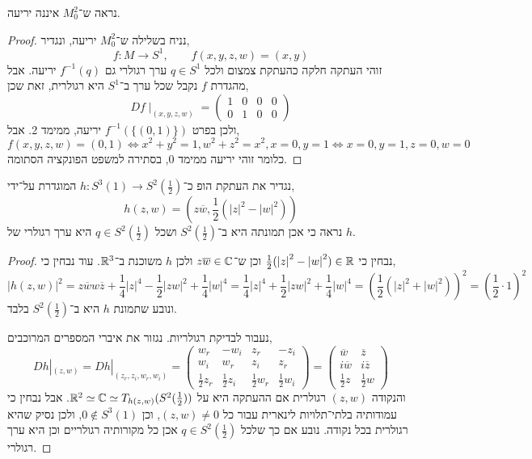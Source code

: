 \subquestion{}
נראה ש־$M_0^2$ איננה יריעה.
\begin{proof}
	נניח בשלילה ש־$M_0^2$ יריעה, ונגדיר,
	\[
		f : M \to S^1,
		\qquad
		f(x, y, z, w) = (x, y)
	\]
	זוהי העתקה חלקה כהעתקת צמצום ולכל $q \in S^1$ ערך רגולרי גם $f^{-1}(q)$ יריעה.
	אבל מהגדרת $f$ נקבל שכל ערך ב־$S^1$ היא רגולרית, זאת שכן,
	\[
		D f \mid_{(x, y, z, w)}
		= \begin{pmatrix}
			1 & 0 & 0 & 0 \\
			0 & 1 & 0 & 0
		\end{pmatrix} 
	\]
	ולכן בפרט $f^{-1}(\{(0, 1)\})$ יריעה, ממימד 2.
	אבל,
	\[
		f(x, y, z, w) = (0, 1)
		\iff x^2 + y^2 = 1, w^2 + z^2 = x^2, x = 0, y = 1
		\iff x = 0, y = 1, z = 0, w = 0
	\]
	כלומר זוהי יריעה ממימד 0, בסתירה למשפט הפונקציה הסתומה.
\end{proof}

\question{}
נגדיר את העתקת הופ כ־$h : S^3(1) \to S^2(\frac{1}{2})$ המוגדרת על־ידי,
\[
	h(z, w)
	= (z \overline{w}, \frac{1}{2} ({|z|}^2 - {|w|}^2))
\]
נראה כי אכן תמונתה היא ב־$S^2(\frac{1}{2})$ ושכל $q \in S^2(\frac{1}{2})$ היא ערך רגולרי של $h$.
\begin{proof}
	נבחין כי $\frac{1}{2} ({|z|}^2 - {|w|}^2) \in \mathbb{R}$ וכן ש־$z \overline{w} \in \mathbb{C}$ ולכן $h$ משוכנת ב־$\mathbb{R}^3$.
	עוד נבחין כי,
	\[
		{|h(z, w)|}^2
		= z \overline{w} w \overline{z} + \frac{1}{4} {|z|}^4 - \frac{1}{2} {|zw|}^2 + \frac{1}{4} {|w|}^4
		= \frac{1}{4} {|z|}^4 + \frac{1}{2} {|zw|}^2 + \frac{1}{4} {|w|}^4
		= {\left(\frac{1}{2} ({|z|}^2 + {|w|}^2)\right)}^2
		= {\left(\frac{1}{2} \cdot 1\right)}^2
	\]
	ונובע שתמונת $h$ היא ב־$S^2(\frac{1}{2})$ בלבד.

	נעבור לבדיקת רגולריות.
	נגזור את איברי המספרים המרוכבים,
	\[
		D h |_{(z, w)}
		= D h |_{(z_r, z_i, w_r, w_i)}
		= \begin{pmatrix}
			w_r & - w_i & z_r & -z_i \\
			w_i & w_r & z_i & z_r \\
			\frac{1}{2} z_r & \frac{1}{2} z_i & \frac{1}{2} w_r & \frac{1}{2} w_i
		\end{pmatrix} 
		= \begin{pmatrix}
			\overline{w} & \overline{z} \\
			i \overline{w} & i \overline{z} \\
			\frac{1}{2} z & \frac{1}{2} w
		\end{pmatrix} 
	\]
	והנקודה $(z, w)$ רגולרית אם ההעתקה היא על $\mathbb{R}^2 \simeq \mathbb{C} \simeq T_{h(z, w)}(S^2(\frac{1}{2}))$.
	אבל נבחין כי עמודותיה בלתי־תלויות לינארית עבור כל $(z, w) \ne 0$, וכן $0 \notin S^3(1)$, ולכן נסיק שהיא רגולרית בכל נקודה.
	נובע אם כך שלכל $q \in S^2(\frac{1}{2})$ אכן כל מקורותיה רגולריים וכן היא ערך רגולרי.
\end{proof}


